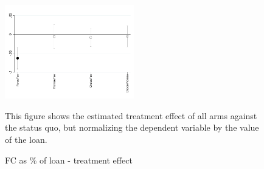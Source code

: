 \documentclass[oneside,11pt]{article}
\begin{document}
\begin{figure}[H]
        \caption{FC as \% of loan - treatment effect}
    \label{fc_perc}
    \begin{center}
        \centering
        \includegraphics[width=0.50\textwidth]{Figuras/fc_perc_te_allarms.pdf}
    \end{center}
     \scriptsize This figure shows the estimated treatment effect of all arms against the status quo, but normalizing the dependent variable by the value of the loan.
\end{figure}
\end{document}
